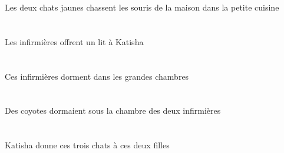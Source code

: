 \begin{exe}
 Les deux chats jaunes chassent les souris de la maison dans la petite cuisine
\ex\glll
   \DEFPlErg{}   \infirmiereAPlErg{}    \INDSgDat{}   \KatishaASgDat{}   \INDSgAbs{}   \litDSgAbs{}  \offrirVdPrsDSg{} \\
   \DEFPlErgP{}   \infirmiereAPlErgP{}    \INDSgDatP{}   \KatishaASgDatP{}   \INDSgAbsP{}   \litDSgAbsP{}  \offrirVdPrsDSgP{} \\
   \DEFPlErgG{}   \infirmiereAPlErgG{}    \INDSgDatG{}   \KatishaASgDatG{}   \INDSgAbsG{}   \litDSgAbsG{}  \offrirVdPrsDSgG{} \\
 Les infirmières offrent un lit à Katisha
\ex\glll
   \DEMPlAbs{}   \infirmiereAPlAbs{}    \DEFPlObl{}   \grandBPl{}   \chambreBPlObl{}   \DANS{}  \dormirViPrsAPl{} \\
   \DEMPlAbsP{}   \infirmiereAPlAbsP{}    \DEFPlOblP{}   \grandBPlP{}   \chambreBPlOblP{}   \DANSP{}  \dormirViPrsAPlP{} \\
   \DEMPlAbsG{}   \infirmiereAPlAbsG{}    \DEFPlOblG{}   \grandBPlG{}   \chambreBPlOblG{}   \DANSG{}  \dormirViPrsAPlG{} \\
 Ces infirmières dorment dans les grandes chambres
\ex\glll
    \DEFSgObl{}    \DEFDuObl{}   \infirmiereADuObl{}   \DE{}   \chambreBSgObl{}   \SOUS{}   \INDPlAbs{}   \coyoteCPlAbs{}  \dormirViPstCPl{} \\
    \DEFSgOblP{}    \DEFDuOblP{}   \infirmiereADuOblP{}   \DEP{}   \chambreBSgOblP{}   \SOUSP{}   \INDPlAbsP{}   \coyoteCPlAbsP{}  \dormirViPstCPlP{} \\
    \DEFSgOblG{}    \DEFDuOblG{}   \infirmiereADuOblG{}   \DEG{}   \chambreBSgOblG{}   \SOUSG{}   \INDPlAbsG{}   \coyoteCPlAbsG{}  \dormirViPstCPlG{} \\
 Des coyotes dormaient sous la chambre des deux infirmières
\ex\glll
   \INDSgErg{}   \KatishaASgErg{}    \DEMDuDat{}   \filleCDuDat{}   \DEMPlAbs{}   \troisDPl{}   \chatDPlAbs{}  \donnerVdPrsDPl{} \\
   \INDSgErgP{}   \KatishaASgErgP{}    \DEMDuDatP{}   \filleCDuDatP{}   \DEMPlAbsP{}   \troisDPlP{}   \chatDPlAbsP{}  \donnerVdPrsDPlP{} \\
   \INDSgErgG{}   \KatishaASgErgG{}    \DEMDuDatG{}   \filleCDuDatG{}   \DEMPlAbsG{}   \troisDPlG{}   \chatDPlAbsG{}  \donnerVdPrsDPlG{} \\
 Katisha donne ces trois chats à ces deux filles
\ex\glll
   \DEMDuErg{}   \tableDDuErg{}   \DEFPlAbs{}   \filleCPlAbs{}  \supporterVtPrsCPl{} \\
   \DEMDuErgP{}   \tableDDuErgP{}   \DEFPlAbsP{}   \filleCPlAbsP{}  \supporterVtPrsCPlP{} \\

\end{exe}
